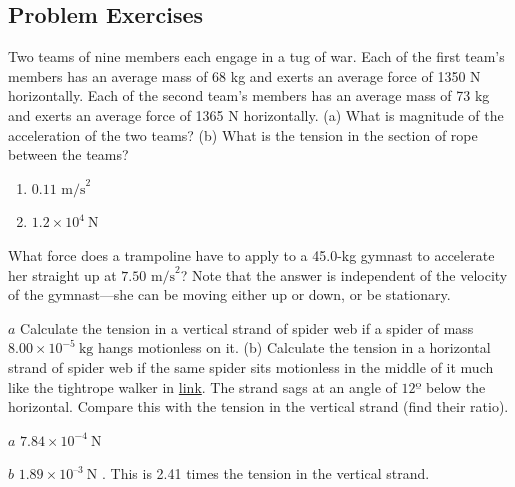 \documentclass[
]{book}
\providecommand{\tightlist}{%
  \setlength{\itemsep}{0pt}\setlength{\parskip}{0pt}}
\newenvironment{problems-exercises}{}{}
\begin{document}
\hypertarget{fs-id1550370}{}
\begin{problems-exercises}

\hypertarget{problem-exercises-2}{%
\subsection{Problem Exercises}\label{problem-exercises-2}}

\hypertarget{fs-id2600233}{}
\leavevmode\hypertarget{fs-id2600234}{}%
Two teams of nine members each engage in a tug of war. Each of the first
team's members has an average mass of 68 kg and exerts an average force
of 1350 N horizontally. Each of the second team's members has an average
mass of 73 kg and exerts an average force of 1365 N horizontally. (a)
What is magnitude of the acceleration of the two teams? (b) What is the
tension in the section of rope between the teams?

\hypertarget{fs-id2067474}{}
\begin{enumerate}
\def\labelenumi{\alph{enumi}.}
\tightlist
\item
  \({0.\text{11\ m/s}^{2}}{}\)
\item
  \({1\text{.}{2 \times \text{10}^{4}}\ \text{N}}{}\)
\end{enumerate}

\hypertarget{fs-id1600446}{}
\leavevmode\hypertarget{fs-id2027585}{}%
What force does a trampoline have to apply to a 45.0-kg gymnast to
accelerate her straight up at \({7\text{.}\text{50\ m/s}^{2}}{}\)? Note
that the answer is independent of the velocity of the gymnast---she can
be moving either up or down, or be stationary.

\hypertarget{fs-id2666528}{}
\leavevmode\hypertarget{fs-id2666529}{}%
\(a\) Calculate the tension in a vertical strand of spider web if a
spider of mass
\({8\text{.}{\text{00} \times \text{10}^{- 5}}\ \text{kg}}{}\) hangs
motionless on it. (b) Calculate the tension in a horizontal strand of
spider web if the same spider sits motionless in the middle of it much
like the tightrope walker in
\protect\hyperlink{import-auto-id2091042}{link}. The strand sags
at an angle of \(\text{12º}{}\) below the horizontal. Compare this with
the tension in the vertical strand (find their ratio).

\leavevmode\hypertarget{fs-id2421761}{}%
\(a\) \({7\text{.}{\text{84} \times \text{10}^{-4}}\ \text{N}}{}\)

\(b\) \({1\text{.}{\text{89} \times \text{10}^{–3}}\ \text{N}}{}\) . This
is 2.41 times the tension in the vertical strand.


\end{problems-exercises}
\end{document}
